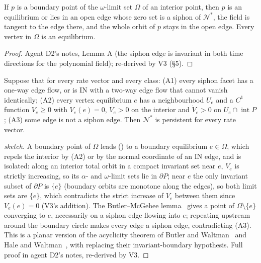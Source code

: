 \documentclass[11pt,a4paper]{report}
\newcommand{\Nd}{\mathcal{N}^{*}}
\begin{document}
\begin{lemma}[agent D2]\label{lem:A}
If \(p\) is a boundary point of the \(\omega\)-limit set \(\Omega\) of an interior point, then \(p\) is an equilibrium or lies
in an open edge whose zero set is a siphon of \(\Nd\), the field is tangent to the edge there, and the whole orbit of \(p\)
stays in the open edge. Every vertex in \(\Omega\) is an equilibrium.
\end{lemma}
\begin{proof}
Agent D2's notes, Lemma A (the siphon edge is invariant in both time directions for the polynomial field); re-derived by
V3 (§5).
\end{proof}

\begin{theorem}\label{thm:P2}
Suppose that for every rate vector and every class: (A1) every siphon facet has a one-way edge flow, or is IN with a
two-way edge flow that cannot vanish identically; (A2) every vertex equilibrium \(e\) has a neighbourhood \(U_e\) and a
\(C^1\) function \(V_e\ge0\) with \(V_e(e)=0\), \(V_e>0\) on the interior and \(\dot V_e>0\) on \(U_e\cap\operatorname{int}P\);
(A3) some edge is not a siphon edge. Then \(\Nd\) is persistent for every rate vector.
\end{theorem}
\begin{proof}[sketch]
A boundary point of \(\Omega\) leads () to a boundary equilibrium \(e\in\Omega\), which repels the interior by
(A2) or by the normal coordinate of an IN edge, and is isolated: along an interior total orbit in a compact invariant
set near \(e\), \(V_e\) is strictly increasing, so its \(\alpha\)- and \(\omega\)-limit sets lie in \(\partial P\); near \(e\)
the only invariant subset of \(\partial P\) is \(\{e\}\) (boundary orbits are monotone along the edges), so both limit
sets are \(\{e\}\), which contradicts the strict increase of \(V_e\) between them since \(V_e(e)=0\) (V3's addition).
The Butler--McGehee lemma~\autocite[Thm~4.1]{ButlerWaltman1986} gives a point of \(\Omega\setminus\{e\}\) converging to \(e\),
necessarily on a siphon edge flowing into \(e\); repeating upstream around the boundary circle makes every edge a siphon
edge, contradicting (A3). This is a planar version of the acyclicity theorem of Butler and
Waltman~\autocite{ButlerWaltman1986} and Hale and Waltman~\autocite{HaleWaltman1989}, with  replacing their
invariant-boundary hypothesis. Full proof in agent D2's notes, re-derived by V3.
\end{proof}
\end{document}

